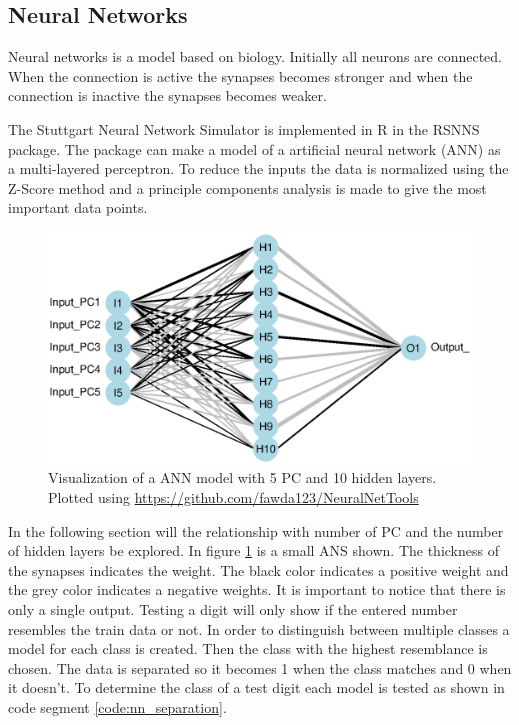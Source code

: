 \subsection{Neural Networks}

Neural networks is a model based on biology. 
Initially all neurons are connected. 
When the connection is active the synapses becomes stronger and when the connection is inactive the synapses becomes weaker.

The Stuttgart Neural Network Simulator is implemented in R in the RSNNS package.
The package can make a model of a artificial neural network (ANN) as a multi-layered perceptron.
To reduce the inputs the data is normalized using the Z-Score method and a principle components analysis is made to give the most important data points.

\begin{figure}[h]
    \includegraphics[width=\textwidth]{graphics/neural_network_visualized}
    \caption[Visualization of a ANN model.]{Visualization of a ANN model with 5 PC and 10 hidden layers. Plotted using \url{https://github.com/fawda123/NeuralNetTools}}
    \label{fig:neural_network_visualised}
\end{figure}

In the following section will the relationship with number of PC and the number of hidden layers be explored.
In figure \ref{fig:neural_network_visualised} is a small ANS shown.
The thickness of the synapses indicates the weight.
The black color indicates a positive weight and the grey color indicates a negative weights.
It is important to notice that there is only a single output. 
Testing a digit will only show if the entered number resembles the train data or not.
In order to distinguish between multiple classes a model for each class is created.
Then the class with the highest resemblance is chosen.
The data is separated so it becomes 1 when the class matches and 0 when it doesn't.
To determine the class of a test digit each model is tested as shown in code segment \ref{code:nn_separation}.

